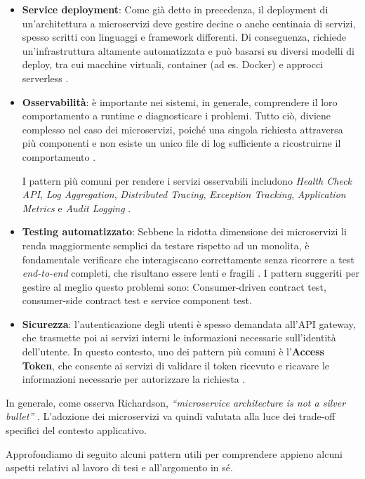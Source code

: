 \begin{itemize}
    \item \textbf{Service deployment}: Come già detto in precedenza, il deployment di un'architettura a microservizi deve gestire decine o anche centinaia di servizi, spesso scritti con linguaggi e framework differenti. Di conseguenza, richiede un’infrastruttura altamente automatizzata e può basarsi su diversi modelli di deploy, tra cui macchine virtuali, container (ad es. Docker) e approcci serverless \cite{Richardson2018}.
    \item \textbf{Osservabilità}: è importante nei sistemi, in generale, comprendere il loro comportamento a runtime e diagnosticare i problemi. Tutto ciò, diviene complesso nel caso dei microservizi, poiché una singola richiesta attraversa più componenti e non esiste un unico file di log sufficiente a ricostruirne il comportamento \cite{Richardson2018}.

    I pattern più comuni per rendere i servizi osservabili includono \textit{Health Check API}, \textit{Log Aggregation}, \textit{Distributed Tracing}, \textit{Exception Tracking}, \textit{Application Metrics} e \textit{Audit Logging} \cite{Richardson2018}.
    
    \item \textbf{Testing automatizzato}: Sebbene la ridotta dimensione dei microservizi li renda maggiormente semplici da testare rispetto ad un monolita, è fondamentale verificare che interagiscano correttamente senza ricorrere a test \textit{end-to-end} completi, che risultano essere lenti e fragili \cite{Richardson2018}. 
    I pattern suggeriti per gestire al meglio questo problemi sono: Consumer-driven contract test, consumer-side contract test e service component test.
    
    \item \textbf{Sicurezza}: l’autenticazione degli utenti è spesso demandata all’API gateway, che trasmette poi ai servizi interni le informazioni necessarie sull’identità dell’utente. In questo contesto, uno dei pattern più comuni è l’\textbf{Access Token}, che consente ai servizi di validare il token ricevuto e ricavare le informazioni necessarie per autorizzare la richiesta \cite{Richardson2018}.
\end{itemize}


In generale, come osserva Richardson, \textit{“microservice architecture is not a silver bullet”} \cite{Richardson2018}. L’adozione dei microservizi va quindi valutata alla luce dei trade-off specifici del contesto applicativo.

Approfondiamo di seguito alcuni pattern utili per comprendere appieno alcuni aspetti relativi al lavoro di tesi e all’argomento in sé.

